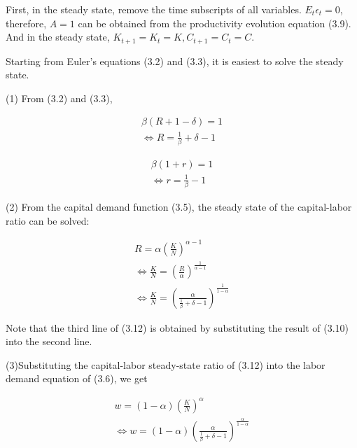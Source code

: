 \documentclass[10pt,math=newtx,citestyle=gb7714-2015,bibstyle=gb7714-2015]{elegantbook}
\begin{document}
	First, in the steady state, remove the time subscripts of all variables. $E_t\epsilon_t=0$, therefore, $A=1$ can be obtained from the productivity evolution equation (3.9). And in the steady state, $K_{t+1}=K_t=K,C_{t+1}=C_t=C$.
	
	Starting from Euler's equations (3.2) and (3.3), it is easiest to solve the steady state. 
	
	(1) From (3.2) and (3.3),
	
	\begin{equation}\label{label}
		\begin{split}
			\beta(R+1-\delta)=1\\
			\Leftrightarrow R=\frac{1}{\beta}+\delta-1
		\end{split}
	\end{equation}
	
	\begin{equation}\label{label}
		\begin{split}
			\beta(1+r)=1\\
			\Leftrightarrow r=\frac{1}{\beta}-1
		\end{split}
	\end{equation}
	
	(2) From the capital demand function (3.5), the steady state of the capital-labor ratio can be solved:
	
	\begin{equation}\label{label}
		\begin{split}
			R=\alpha(\frac{K}{N})^{\alpha-1}\\
			\Leftrightarrow \frac{K}{N}=(\frac{R}{\alpha})^{\frac{1}{\alpha-1}}\\
			\Leftrightarrow \frac{K}{N}=(\frac{\alpha}{\frac{1}{\beta}+\delta-1})^{\frac{1}{1-\alpha}}
		\end{split}
	\end{equation}
	
	Note that the third line of (3.12) is obtained by substituting the result of (3.10) into the second line.
	
	(3)Substituting the capital-labor steady-state ratio of (3.12) into the labor demand equation of (3.6), we get
	
	\begin{equation}\label{label}
		\begin{split}
			w=(1-\alpha)(\frac{K}{N})^{\alpha}\\
			\Leftrightarrow w=(1-\alpha)(\frac{\alpha}{\frac{1}{\beta}+\delta-1})^{\frac{\alpha}{1-\alpha}}
		\end{split}
	\end{equation}
	
\end{document}
